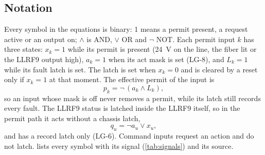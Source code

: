 \subsection{Notation}

Every symbol in the equations is binary: 1 means a permit present, a request active or
an output on; $\wedge$ is AND, $\vee$ OR and $\neg$ NOT. Each permit input $k$ has
three states: $x_k = 1$ while its permit is present (\qty{24}{\volt} on the line, the
fiber lit or the LLRF9 output high), $a_k = 1$ when its act mask is set (LG-8), and
$L_k = 1$ while its fault latch is set. The latch is set when $x_k = 0$ and is cleared
by a reset only if $x_k = 1$ at that moment. The effective permit of the input is
\begin{equation}
p_k = \neg\,(a_k \wedge L_k), \label{eq:pk}
\end{equation}
so an input whose mask is off never removes a permit, while its latch still records
every fault. The LLRF9 status is latched inside the LLRF9 itself, so in the permit
path it acts without a chassis latch,
\[
q_u = \neg a_u \vee x_u,
\]
and has a record latch only (LG-6). Command inputs request an action and do not
latch.  lists every symbol with its signal (\cref{tab:signals}) and
its source.

